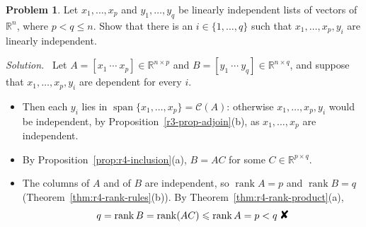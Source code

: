 \documentclass[12pt]{article}
\newcommand{\R}{\mathbb R}
\newcommand{\contradiction}{\mathord{\text{\large\ding{56}}}}
\DeclareMathOperator{\rank}{rank}
\DeclareMathOperator{\Span}{span}
\theoremstyle{definition}
\newtheorem{problem}{Problem}
\newenvironment{solution}{\par\noindent\textit{Solution.}\ }{\par\smallskip}
\begin{document}
\begin{problem}\label{r4-ex-exchange}
Let \(x_1,\dots,x_p\) and \(y_1,\dots,y_q\) be linearly independent lists of vectors of \(\R^n\), where
\(p<q\leqslant n\). Show that there is an \(i\in\{1,\dots,q\}\) such that \(x_1,\dots,x_p,y_i\) are linearly
independent.
\end{problem}
\begin{solution}
Let \(A=[x_1\ \cdots\ x_p]\in\R^{n\times p}\) and \(B=[y_1\ \cdots\ y_q]\in\R^{n\times q}\), and suppose that
\(x_1,\dots,x_p,y_i\) are dependent for every \(i\).
\begin{itemize}
\item Then each \(y_i\) lies in \(\Span\{x_1,\dots,x_p\}=\mathcal C(A)\): otherwise \(x_1,\dots,x_p,y_i\) would be
independent, by Proposition~\ref{r3-prop-adjoin}(b), as \(x_1,\dots,x_p\) are independent.
\item By Proposition~\ref{prop:r4-inclusion}(a), \(B=AC\) for some \(C\in\R^{p\times q}\).
\item The columns of \(A\) and of \(B\) are independent, so \(\rank A=p\) and \(\rank B=q\)
(Theorem~\ref{thm:r4-rank-rules}(b)). By Theorem~\ref{thm:r4-rank-product}(a),
\[
q=\rank B=\rank(AC)\leqslant\rank A=p<q\ \contradiction
\]
\end{itemize}
\end{solution}
\end{document}
